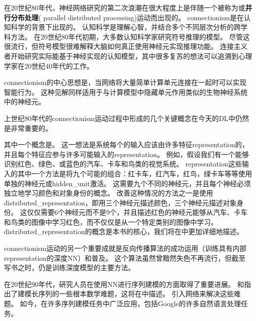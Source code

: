 在20世纪80年代，神经网络研究的第二次浪潮在很大程度上是伴随一个被称为或\textbf{并行分布处理}( parallel distributed processing)运动而出现的\citep{Rumelhart86,mcclelland1995appeal}。
\gls{connectionism}是在认知科学的背景下出现的。
认知科学是理解心智，并结合多个不同层次分析的跨学科方法。
在20世纪80年代初期，大多数认知科学家研究符号推理的模型。
尽管这很流行，但符号模型很难解释大脑如何真正使用神经元实现推理功能。 
连接主义者开始研究实际能基于神经实现的认知模型\citep{Touretzky1985}，其中很多复苏的想法可以追溯到心理学家在20世纪40年代的工作\citep{Hebb49}。

\gls{connectionism}的中心思想是，当网络将大量简单计算单元连接在一起时可以实现智能行为。
这种见解同样适用于与计算模型中隐藏单元作用类似的生物神经系统中的神经元。  

上世纪80年代的\gls{connectionism}运动过程中形成的几个关键概念在今天的\gls{DL}中仍然是非常重要的。

其中一个概念是\citep{Hinton-et-al-PDP1986}。
这一想法是系统每个的输入应该由许多特征\gls{representation}的，并且每个特征应参与许多可能输入的\gls{representation}。
例如，假设我们有一个能够识别红色、绿色、或蓝色的汽车、卡车和鸟类的视觉系统。
\gls{representation}这些输入的其中一个方法是将九个可能的组合：红卡车，红汽车，红鸟，绿卡车等等使用单独的神经元或\gls{hidden_unit}激活。
这需要九个不同的神经元，并且每个神经必须独立地学习颜色和对象身份的概念。
改善这种情况的方法之一是使用\gls{distributed_representation}，即用三个神经元描述颜色，三个神经元描述对象身份。 
这仅仅需要6个神经元而不是9个，并且描述红色的神经元能够从汽车、卡车和鸟类的图像中学习红色，而不仅仅是从一个特定类别的图像中学习。 
\gls{distributed_representation}的概念是本书的核心，我们将在中更加详细地描述。


\gls{connectionism}运动的另一个重要成就是反向传播算法的成功运用（训练具有内部\gls{representation}的深度\gls{NN}）和普及\citep{RHW,Lecun-these87}。
这个算法虽然曾黯然失色不再流行，但截至写书之时，仍是训练深度模型的主要方法。%

在20世纪90年代，研究人员在使用\gls{NN}进行序列建模的方面取得了重要进展。
\citet{Hochreiter91}和\citet{Bengio1994ITNN}指出了建模长序列的一些根本数学难题，这将在中描述。
\citet{Hochreiter+Schmidhuber-1997}引入网络来解决这些难题。
如今，在许多序列建模任务中广泛应用，包括Google的许多自然语言处理任务。

